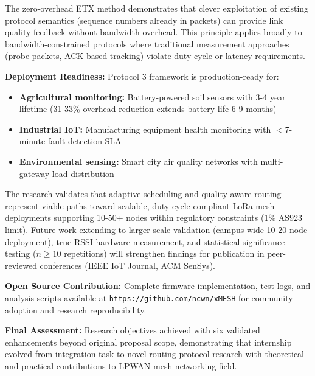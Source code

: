 The zero-overhead ETX method demonstrates that clever exploitation of existing protocol semantics (sequence numbers already in packets) can provide link quality feedback without bandwidth overhead. This principle applies broadly to bandwidth-constrained protocols where traditional measurement approaches (probe packets, ACK-based tracking) violate duty cycle or latency requirements.

\textbf{Deployment Readiness:} Protocol 3 framework is production-ready for:
\begin{itemize}
\item \textbf{Agricultural monitoring:} Battery-powered soil sensors with 3-4 year lifetime (31-33\% overhead reduction extends battery life 6-9 months)
\item \textbf{Industrial IoT:} Manufacturing equipment health monitoring with $<$7-minute fault detection SLA
\item \textbf{Environmental sensing:} Smart city air quality networks with multi-gateway load distribution
\end{itemize}

The research validates that adaptive scheduling and quality-aware routing represent viable paths toward scalable, duty-cycle-compliant LoRa mesh deployments supporting 10-50+ nodes within regulatory constraints (1\% AS923 limit). Future work extending to larger-scale validation (campus-wide 10-20 node deployment), true RSSI hardware measurement, and statistical significance testing ($n \geq 10$ repetitions) will strengthen findings for publication in peer-reviewed conferences (IEEE IoT Journal, ACM SenSys).

\textbf{Open Source Contribution:} Complete firmware implementation, test logs, and analysis scripts available at \texttt{https://github.com/ncwn/xMESH} for community adoption and research reproducibility.

\textbf{Final Assessment:} Research objectives achieved with six validated enhancements beyond original proposal scope, demonstrating that internship evolved from integration task to novel routing protocol research with theoretical and practical contributions to LPWAN mesh networking field.

